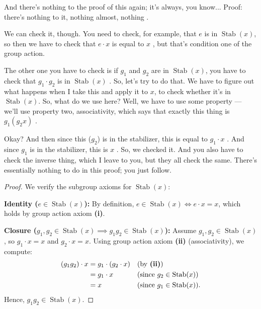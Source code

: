 \begin{proofWrapper}
\begin{speech}[00:18:52 - 00:20:19]
And there's nothing to the proof of this again; it's always, you know... Proof: there's nothing to it, nothing almost, nothing .

We can check it, though. You need to check, for example, that $e$ is in $\operatorname{Stab}(x)$, so then we have to check that $e \cdot x$ is equal to $x$ , but that's condition one of the group action.

The other one you have to check is if $g_1$ and $g_2$ are in $\operatorname{Stab}(x)$, you have to check that $g_1 \cdot g_2$ is in $\operatorname{Stab}(x)$ . So, let's try to do that. We have to figure out what happens when I take this and apply it to $x$, to check whether it's in $\operatorname{Stab}(x)$. So, what do we use here? Well, we have to use some property --- we'll use property two, associativity, which says that exactly this thing is $g_1 (g_2 x)$ .

Okay? And then since this ($g_2$) is in the stabilizer, this is equal to $g_1 \cdot x$ . And since $g_1$ is in the stabilizer, this is $x$ . So, we checked it. And you also have to check the inverse thing, which I leave to you, but they all check the same. There's essentially nothing to do in this proof; you just follow.
\end{speech}

\begin{content}
\begin{proof}
We verify the subgroup axioms for $\operatorname{Stab}(x)$:

\textbf{Identity ($e \in \operatorname{Stab}(x)$):} By definition, $e \in \operatorname{Stab}(x) \iff e \cdot x = x$, which holds by group action axiom \textbf{(i)}.

\textbf{Closure ($g_1, g_2 \in \operatorname{Stab}(x) \implies g_1 g_2 \in \operatorname{Stab}(x)$):} Assume $g_1, g_2 \in \operatorname{Stab}(x)$, so $g_1 \cdot x = x$ and $g_2 \cdot x = x$. Using group action axiom \textbf{(ii)} (associativity), we compute:
\begin{align*}
(g_1 g_2) \cdot x &= g_1 \cdot (g_2 \cdot x) && \text{(by \textbf{(ii)})} \\
&= g_1 \cdot x && \text{(since } g_2 \in \operatorname{Stab}(x)\text{)} \\
&= x && \text{(since } g_1 \in \operatorname{Stab}(x)\text{)}.
\end{align*}
Hence, $g_1 g_2 \in \operatorname{Stab}(x)$.


\end{proof}
\end{content}
\end{proofWrapper}
